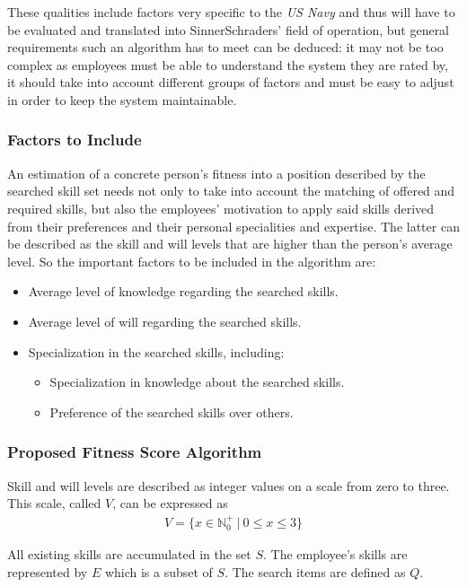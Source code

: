 \label{customizable}
These qualities include factors very specific to the \textit{US Navy} and thus will have to be evaluated and translated into SinnerSchraders' field of operation, but general requirements such an algorithm has to meet can be deduced: it may not be too complex as employees must be able to understand the system they are rated by, it should take into account different groups of factors and must be easy to adjust in order to keep the system maintainable.

\subsubsection{Factors to Include}
An estimation of a concrete person's fitness into a position described by the searched skill set needs not only to take into account the matching of offered and required skills, but also the employees' motivation to apply said skills derived from their preferences and their personal specialities and expertise. The latter can be described as the skill and will levels that are higher than the person's average level. So the important factors to be included in the algorithm are:
\begin{itemize}
  \item Average level of knowledge regarding the searched skills.
  \item Average level of will regarding the searched skills.
  \item Specialization in the searched skills, including:
  \begin{itemize}
    \item Specialization in knowledge about the searched skills.
    \item Preference of the searched skills over others.
  \end{itemize}
\end{itemize}


\subsubsection{Proposed Fitness Score Algorithm}
\label{fitnessscore_impl}
Skill and will levels are described as integer values on a scale from zero to three. This scale, called $V$, can be expressed as
\begin{gather*}
  V = \{ x \in \mathbb{N}_0^+ \ | \  0 \leq x \leq 3\}
\end{gather*}

All existing skills are accumulated in the set $S$. The employee's skills are represented by $E$ which is a subset of $S$. The search items are
defined as $Q$.

